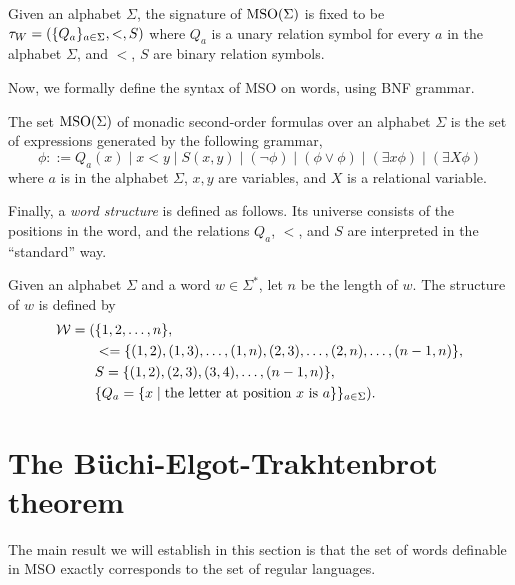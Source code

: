 \documentclass[11pt,twoside=off,numbers=noenddot]{scrbook}
\begin{document}
\begin{definition}
  Given an alphabet $\Sigma$, the signature of $\text{MSO}(\Sigma)$ is
  fixed to be $\tau_W = (\{ Q_a \}_{a \in \Sigma}, <, S)$ where $Q_a$
  is a unary relation symbol for every $a$ in the alphabet $\Sigma$,
  and $<$, $S$ are binary relation symbols.
\end{definition}

Now, we formally define the syntax of MSO on words, using BNF grammar.

\begin{definition}
  The set $\text{MSO}(\Sigma)$ of monadic second-order formulas over an
  alphabet $\Sigma$ is the set of expressions generated by the
  following grammar,
  \[ \phi ::= Q_a(x) \mid x < y \mid S(x, y) \mid (\neg \phi) \mid
  (\phi \vee \phi) \mid (\exists x \phi) \mid (\exists X \phi) \]
  where $a$ is in the alphabet $\Sigma$, $x, y$ are variables, and
  $X$ is a relational variable.
\end{definition}

Finally, a \emph{word structure} is defined as follows. Its universe
consists of the positions in the word, and the relations $Q_a$, $<$,
and $S$ are interpreted in the ``standard'' way.

\begin{definition}
  Given an alphabet $\Sigma$ and a word $w \in \Sigma^\ast$, let $n$
  be the length of $w$. The structure of $w$ is defined by
  \begin{align*}
    \mathcal{W} = ( & \{ 1, 2, \dots, n \}, \\
      & < = \{ (1, 2), (1, 3), \dots, (1, n), (2, 3), \dots, (2,
      n), \dots, (n - 1, n) \}, \\
      & S = \{ (1, 2), (2, 3), (3, 4), \dots, (n - 1, n) \}, \\
      & \{ Q_a = \{ x \mid \text{the letter at position $x$ is
    $a$} \} \}_{a \in \Sigma}).
  \end{align*}
\end{definition}


\section{The Büchi-Elgot-Trakhtenbrot theorem}
The main result we will establish in this section is that the set of
words definable in MSO exactly corresponds to the set of regular languages.
\end{document}
